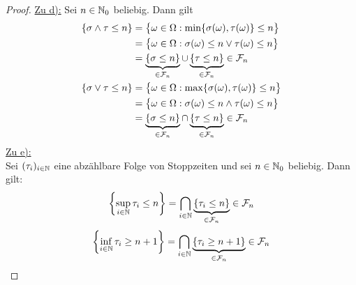 \documentclass[12pt,a4paper]{article}
\begin{document}
\begin{proof}

\underline{Zu d):} Sei $n\in\mathbb{N}_0$ beliebig. Dann gilt
\begin{align*}
\{\sigma \wedge \tau \leq n \}
&=\big\lbrace\omega\in\Omega:\min\lbrace\sigma(\omega),\tau(\omega)\rbrace\leq n\big\rbrace\\
&=\big\lbrace\omega\in\Omega:\sigma(\omega)\leq n\vee\tau(\omega)\leq n\big\rbrace\\
&=\underbrace{\{\sigma \leq n\}}_{\in \mathcal{F}_n} \cup \underbrace{\{\tau \leq n\}}_{\in\mathcal{F}_n} \in \mathcal{F}_n \\
\{\sigma \vee \tau \leq n \}
&=\big\lbrace\omega\in\Omega:\max\lbrace\sigma(\omega),\tau(\omega)\rbrace\leq n\big\rbrace\\
&=\big\lbrace\omega\in\Omega:\sigma(\omega)\leq n\wedge\tau(\omega)\leq n\big\rbrace\\
&=\underbrace{\{\sigma \leq n\}}_{\in \mathcal{F}_n} \cap \underbrace{\{\tau \leq n\}}_{\in\mathcal{F}_n} \in \mathcal{F}_n \\
\end{align*}
\underline{Zu e):}\\
Sei $(\tau_i)_{i\in\mathbb{N}}$ eine abzählbare Folge von Stoppzeiten und sei $n\in\mathbb{N}_0$ beliebig. Dann gilt:
\begin{align*}
\left\lbrace\sup_{i\in\mathbb{N}} \tau_{i} \leq n\right\rbrace
= \bigcap_{i\in\mathbb{N}}\underbrace{\{\tau_i \leq n\}}_{\in\mathcal{F}_n} \in \mathcal{F}_n
\end{align*}
\begin{align*}
\left\lbrace\inf_{i\in\mathbb{N}} \tau_{i} \geq n+1\right\rbrace = \bigcap_{i\in\mathbb{N}}\underbrace{\{\tau_i \geq n+1\}}_{\in\mathcal{F}_n} \in \mathcal{F}_n
\end{align*}

\end{proof}
\end{document}
